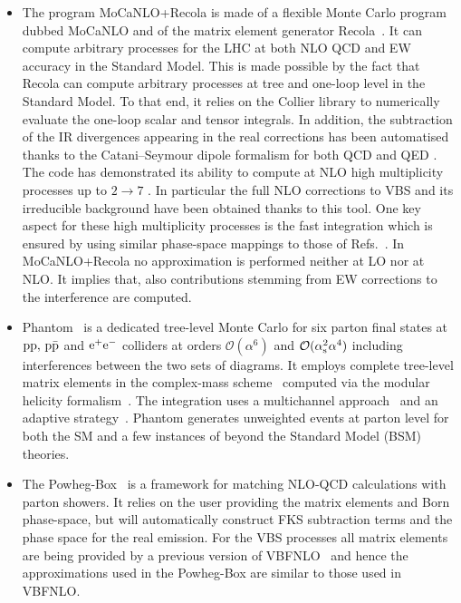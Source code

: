 \begin{itemize}
\item The program {\sc MoCaNLO+Recola} is made of a flexible Monte Carlo program dubbed {\sc MoCaNLO} and of the matrix element generator {\sc Recola}~\cite{Actis:2012qn,Actis:2016mpe}.
It can compute arbitrary processes for the LHC at both NLO QCD and EW accuracy in the Standard Model.
This is made possible by the fact that {\sc Recola} can compute arbitrary processes at tree and one-loop level in the Standard Model.
To that end, it relies on the {\sc Collier} library \cite{Denner:2014gla,Denner:2016kdg} to numerically evaluate the one-loop scalar and tensor integrals.
In addition, the subtraction of the IR divergences appearing in the real corrections has been automatised thanks to the Catani--Seymour dipole formalism for both QCD and QED \cite{Catani:1996vz,Dittmaier:1999mb}.
The code has demonstrated its ability to compute at NLO high multiplicity processes up to $2 \to 7$ \cite{Denner:2015yca,Denner:2016wet}.
In particular the full NLO corrections to VBS and its irreducible background \cite{Biedermann:2016yds,Biedermann:2017bss} have been obtained thanks to this tool.
One key aspect for these high multiplicity processes is the fast integration which is ensured by using similar phase-space mappings to those of Refs.~\cite{Berends:1994pv,Denner:1999gp,Dittmaier:2002ap}. 
In {\sc MoCaNLO+Recola} no approximation is performed neither at LO nor at NLO.
It implies that, also contributions stemming from EW corrections to the interference are computed.
        
  \item {\sc Phantom}~\cite{Ballestrero:2007xq} is a dedicated tree-level Monte Carlo for six parton final states 
  at $\text{p} \text{p},\, \text{p}\bar{\text{p}}$ and $\text{e}^+\text{e}^-$ colliders at orders $\mathcal O(\alpha^6)$ and $\mathcal O(\alpha_\text{s}^2\alpha^4)$ including interferences between the two sets of diagrams.
It employs complete tree-level matrix elements in the complex-mass scheme~\cite{Denner:1999gp,Denner:2005fg,Denner:2006ic} computed via the modular helicity formalism~\cite{Ballestrero:1999md,Ballestrero:1994jn}.
The integration uses a multichannel approach~\cite{Berends:1984gf} and an adaptive strategy~\cite{Lepage:1977sw}.
{\sc Phantom} generates unweighted events at parton level for both the SM and a few instances of beyond the Standard Model (BSM) theories.

  \item The {\sc Powheg-Box}~\cite{Nason:2004rx,Frixione:2007vw,Alioli:2010xd} is a framework for matching NLO-QCD calculations with parton showers.
It relies on the user providing the matrix elements and Born phase-space, but will automatically construct FKS \cite{Frixione:1995ms} subtraction terms and the phase space for the real emission.
For the VBS processes all matrix elements are being provided by a previous version of {\sc VBFNLO}~\cite{Arnold:2008rz, Arnold:2011wj, Baglio:2014uba} and hence the approximations used in the {\sc Powheg-Box} are similar to those used in {\sc VBFNLO}.


\end{itemize}
